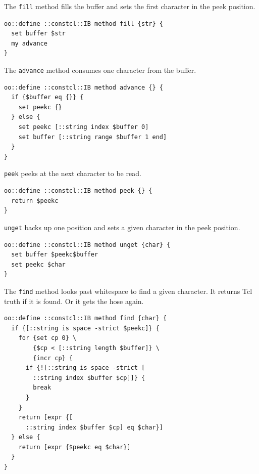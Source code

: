 \documentclass[twoside,9pt]{report}
\begin{document}
The \texttt{fill} method fills the buffer and sets the first character in the peek position.

\noindent\makebox[\linewidth]{\rule{\linewidth}{0.4pt}}
\begin{lstlisting}
oo::define ::constcl::IB method fill {str} {
  set buffer $str
  my advance
}
\end{lstlisting}
\noindent\makebox[\linewidth]{\rule{\linewidth}{0.4pt}}

The \texttt{advance} method consumes one character from the buffer.

\noindent\makebox[\linewidth]{\rule{\linewidth}{0.4pt}}
\begin{lstlisting}
oo::define ::constcl::IB method advance {} {
  if {$buffer eq {}} {
    set peekc {}
  } else {
    set peekc [::string index $buffer 0]
    set buffer [::string range $buffer 1 end]
  }
}
\end{lstlisting}
\noindent\makebox[\linewidth]{\rule{\linewidth}{0.4pt}}

\texttt{peek} peeks at the next character to be read.

\noindent\makebox[\linewidth]{\rule{\linewidth}{0.4pt}}
\begin{lstlisting}
oo::define ::constcl::IB method peek {} {
  return $peekc
}
\end{lstlisting}
\noindent\makebox[\linewidth]{\rule{\linewidth}{0.4pt}}

\texttt{unget} backs up one position and sets a given character in the peek position.

\noindent\makebox[\linewidth]{\rule{\linewidth}{0.4pt}}
\begin{lstlisting}
oo::define ::constcl::IB method unget {char} {
  set buffer $peekc$buffer
  set peekc $char
}
\end{lstlisting}
\noindent\makebox[\linewidth]{\rule{\linewidth}{0.4pt}}

The \texttt{find} method looks past whitespace to find a given character. It returns Tcl truth if it is found. Or it gets the hose again.

\noindent\makebox[\linewidth]{\rule{\linewidth}{0.4pt}}
\begin{lstlisting}
oo::define ::constcl::IB method find {char} {
  if {[::string is space -strict $peekc]} {
    for {set cp 0} \
        {$cp < [::string length $buffer]} \
        {incr cp} {
      if {![::string is space -strict [
        ::string index $buffer $cp]]} {
        break
      }
    }
    return [expr {[
      ::string index $buffer $cp] eq $char}]
  } else {
    return [expr {$peekc eq $char}]
  }
}
\end{lstlisting}
\noindent\makebox[\linewidth]{\rule{\linewidth}{0.4pt}}
\end{document}
